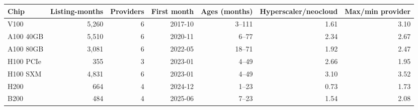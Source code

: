 \begin{tabular}{lrrrrrr}
\hline
Chip & Listing-months & Providers & First month & Ages (months) & Hyperscaler/neocloud & Max/min provider \\
\hline
V100 & 5{,}260 & 6 & 2017-10 & 3--111 & 1.61 & 3.10 \\
A100 40GB & 5{,}510 & 6 & 2020-11 & 6--77 & 2.34 & 2.67 \\
A100 80GB & 3{,}081 & 6 & 2022-05 & 18--71 & 1.92 & 2.47 \\
H100 PCIe & 355 & 3 & 2023-01 & 4--49 & 2.66 & 1.95 \\
H100 SXM & 4{,}831 & 6 & 2023-01 & 4--49 & 3.10 & 3.52 \\
H200 & 664 & 4 & 2024-12 & 1--23 & 0.73 & 1.73 \\
B200 & 484 & 4 & 2025-06 & 7--23 & 1.54 & 2.08 \\
\hline
\end{tabular}

